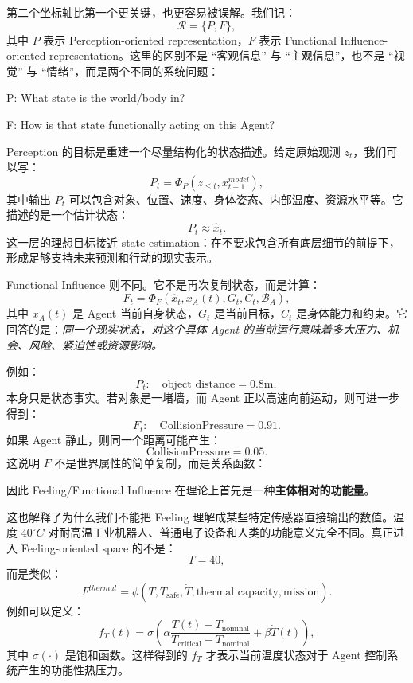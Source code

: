 第二个坐标轴比第一个更关键，也更容易被误解。我们记：
\[
\mathcal R
=
\{P,F\},
\]
其中 $P$ 表示 Perception-oriented representation，$F$ 表示 Functional Influence-oriented representation。这里的区别不是 ``客观信息'' 与 ``主观信息''，也不是 ``视觉'' 与 ``情绪''，而是两个不同的系统问题：

\begin{statementbox}
P: What state is the world/body in?
\end{statementbox}

\begin{statementbox}
F: How is that state functionally acting on this Agent?
\end{statementbox}

Perception 的目标是重建一个尽量结构化的状态描述。给定原始观测 $z_t$，我们可以写：
\[
P_t
=
\Phi_P(z_{\leq t},x_{t-1}^{model}),
\]
其中输出 $P_t$ 可以包含对象、位置、速度、身体姿态、内部温度、资源水平等。它描述的是一个估计状态：
\[
P_t
\approx
\hat{x}_t.
\]
这一层的理想目标接近 state estimation：在不要求包含所有底层细节的前提下，形成足够支持未来预测和行动的现实表示。

Functional Influence 则不同。它不是再次复制状态，而是计算：
\[
F_t
=
\Phi_F(
\hat{x}_t,
x_A(t),
G_t,
C_t,
\mathcal B_A
),
\]
其中 $x_A(t)$ 是 Agent 当前自身状态，$G_t$ 是当前目标，$C_t$ 是身体能力和约束。它回答的是：\emph{同一个现实状态，对这个具体 Agent 的当前运行意味着多大压力、机会、风险、紧迫性或资源影响。}

例如：
\[
P_t:
\quad
\text{object distance}=0.8\mathrm{m},
\]
本身只是状态事实。若对象是一堵墙，而 Agent 正以高速向前运动，则可进一步得到：
\[
F_t:
\quad
\mathrm{CollisionPressure}=0.91.
\]
如果 Agent 静止，则同一个距离可能产生：
\[
\mathrm{CollisionPressure}=0.05.
\]
这说明 $F$ 不是世界属性的简单复制，而是关系函数：
\begin{statementbox}
\centering
{}
\end{statementbox}
因此 Feeling/Functional Influence 在理论上首先是一种\textbf{主体相对的功能量}。

这也解释了为什么我们不能把 Feeling 理解成某些特定传感器直接输出的数值。温度 $40^\circ C$ 对耐高温工业机器人、普通电子设备和人类的功能意义完全不同。真正进入 Feeling-oriented space 的不是：
\[
T=40,
\]
而是类似：
\[
F^{thermal}
=
\phi(
T,
T_{\mathrm{safe}},
\dot{T},
\text{thermal capacity},
\text{mission}
).
\]
例如可以定义：
\[
f_T(t)
=
\sigma
\left(
\alpha
\frac{T(t)-T_{\mathrm{nominal}}}
{T_{\mathrm{critical}}-T_{\mathrm{nominal}}}
+
\beta\dot{T}(t)
\right),
\]
其中 $\sigma(\cdot)$ 是饱和函数。这样得到的 $f_T$ 才表示当前温度状态对于 Agent 控制系统产生的功能性热压力。

